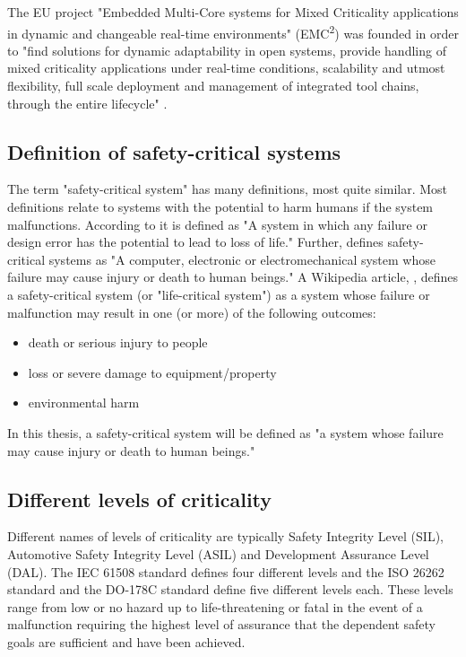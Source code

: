 The EU project "Embedded Multi-Core systems for Mixed Criticality applications in dynamic and changeable real-time environments" (EMC\textsuperscript{2}) was founded in order to "find solutions for dynamic adaptability in open systems, provide handling of mixed criticality applications under real-time conditions, scalability and utmost flexibility, full scale deployment and management of integrated tool chains, through the entire lifecycle" \cite{weber2015}. 

\subsection{Definition of safety-critical systems}
The term "safety-critical system" has many definitions, most quite similar. Most definitions relate to systems with the potential to harm humans if the system malfunctions. According to \cite{website:encyclopedia} it is defined as "A system in which any failure or design error has the potential to lead to loss of life." Further, \cite{website:dictionary} defines safety-critical systems as "A computer, electronic or electromechanical system whose failure may cause injury or death to human beings." A Wikipedia article, \cite{website:wikipedia}, defines a safety-critical system (or "life-critical system") as a system whose failure or malfunction may result in one (or more) of the following outcomes:
\begin{itemize}
\item death or serious injury to people
\item loss or severe damage to equipment/property
\item environmental harm
\end{itemize}
In this thesis, a safety-critical system will be defined as "a system whose failure may cause injury or death to human beings."

\subsection{Different levels of criticality}
Different names of levels of criticality are typically Safety Integrity Level (SIL), Automotive Safety Integrity Level (ASIL) and Development Assurance Level (DAL). The IEC 61508 standard \cite{IEC61508} defines four different levels and the ISO 26262 standard \cite{ISO26262} and the DO-178C standard \cite{DO178C} define five different levels each. These levels range from low or no hazard up to life-threatening or fatal in the event of a malfunction requiring the highest level of assurance that the dependent safety goals are sufficient and have been achieved.\\

